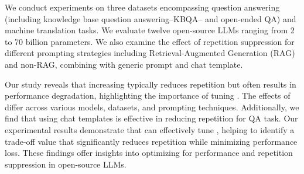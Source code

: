 We conduct experiments on three datasets encompassing question answering (including knowledge base question answering--KBQA-- and open-ended QA) and machine translation tasks.
We evaluate twelve open-source LLMs ranging from 2 to 70 billion parameters. 
We also examine the effect of repetition suppression for different prompting strategies including Retrieval-Augmented Generation (RAG) \cite{lewis2020retrieval} and non-RAG, combining with generic prompt and chat template.

Our study reveals that increasing \rpp typically reduces repetition but often results in performance degradation, highlighting the importance of tuning \rpp. The effects of \rpp differ across various models, datasets, and prompting techniques. Additionally, we find that using chat templates is effective in reducing repetition for QA task. Our experimental results demonstrate that \rap can effectively tune \rpp, helping to identify a trade-off value that significantly reduces repetition while minimizing performance loss.
These findings offer insights into optimizing \rpp for performance and repetition suppression in open-source LLMs.

